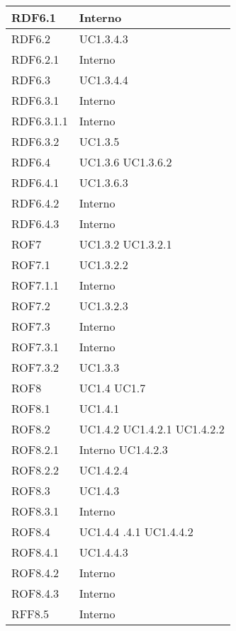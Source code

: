 \begin{center}
\begin{longtable}{| p{4cm} | p{4cm} |}
	\hline
	RDF6.1  &  Interno \\
	\hline
	RDF6.2  &  UC1.3.4.3 \\
	\hline
	RDF6.2.1  &  Interno \\
	\hline
	RDF6.3  &  UC1.3.4.4 \\
	\hline
	RDF6.3.1  &  Interno \\
	\hline
	RDF6.3.1.1  &  Interno \\
	\hline
	RDF6.3.2  &  UC1.3.5 \\
	\hline
	RDF6.4  &  UC1.3.6 \newline UC1.3.6.2 \\
	\hline
	RDF6.4.1  &  UC1.3.6.3 \\
	\hline
	RDF6.4.2  &  Interno \\
	\hline
	RDF6.4.3  &  Interno \\
	\hline
	ROF7  &  UC1.3.2 \newline UC1.3.2.1 \\
	\hline
	ROF7.1  &  UC1.3.2.2 \\
	\hline
	ROF7.1.1  &  Interno \\
	\hline
	ROF7.2  &  UC1.3.2.3 \\
	\hline
	ROF7.3  &  Interno \\
	\hline
	ROF7.3.1  &  Interno \\
	\hline
	ROF7.3.2  &  UC1.3.3 \\
	\hline
	ROF8  &  UC1.4 \newline UC1.7 \\
	\hline
	ROF8.1  &  UC1.4.1 \\
	\hline
	ROF8.2  &  UC1.4.2 \newline UC1.4.2.1 \newline UC1.4.2.2 \\
	\hline
	ROF8.2.1  &  Interno \newline UC1.4.2.3 \\
	\hline
	ROF8.2.2  &  UC1.4.2.4 \\
	\hline
	ROF8.3  &  UC1.4.3 \\
	\hline
	ROF8.3.1  &  Interno \\
	\hline
	ROF8.4  &  UC1.4.4 \newline 1.4.4.1 \newline UC1.4.4.2 \\
	\hline
	ROF8.4.1  &  UC1.4.4.3 \\
	\hline
	ROF8.4.2  &  Interno \\
	\hline
	ROF8.4.3  &  Interno \\
	\hline
	RFF8.5	&	Interno\\

\end{longtable}
\end{center}
